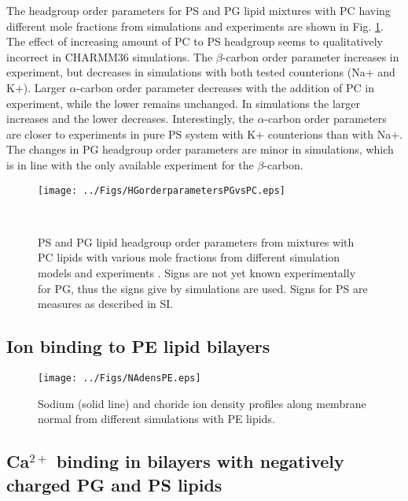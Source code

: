 \documentclass[aps,prl,superscriptaddress,twocolumn]{revtex4}
\begin{document}
The headgroup order parameters for PS and PG lipid mixtures with PC
having different mole fractions from simulations and experiments \cite{borle85,roux90}
are shown in Fig. \ref{HGorderparametersPSPGvsPC}. The effect of increasing
amount of PC to PS headgroup seems to qualitatively incorrect in CHARMM36 simulations.
The $\beta$-carbon order parameter increases in experiment, but decreases
in simulations with both tested counterions (Na+ and K+). Larger
$\alpha$-carbon order parameter decreases with the addition of PC
in experiment, while the lower remains unchanged. In simulations the
larger increases and the lower decreases.
Interestingly, the $\alpha$-carbon order parameters are closer to experiments
in pure PS system with K+ counterions than with Na+. 
The changes in PG headgroup order parameters are minor in simulations, which
is in line with the only available experiment for the $\beta$-carbon.
\begin{figure}[]
  \centering
  \texttt{[image: ../Figs/HGorderparametersPGvsPC.eps]}
  \caption{\label{HGorderparametersPSPGvsPC}
    PS and PG lipid headgroup order parameters from mixtures with PC
    lipids with various mole fractions from different simulation models and experiments \cite{borle85,roux90}.
    Signs are not yet known experimentally for PG, thus the signs give by simulations are used.
    Signs for PS are measures as described in SI.
  }
   \\
\end{figure}

\subsection{Ion binding to PE lipid bilayers}

\begin{figure}[]
  \centering
  \texttt{[image: ../Figs/NAdensPE.eps]}
  \caption{\label{NAdensPE}
    Sodium (solid line) and choride ion density profiles along membrane normal
    from different simulations with PE lipids.
  }
\end{figure}

\subsection{Ca$^{2+}$ binding in bilayers with negatively charged PG and PS lipids}
\end{document}

